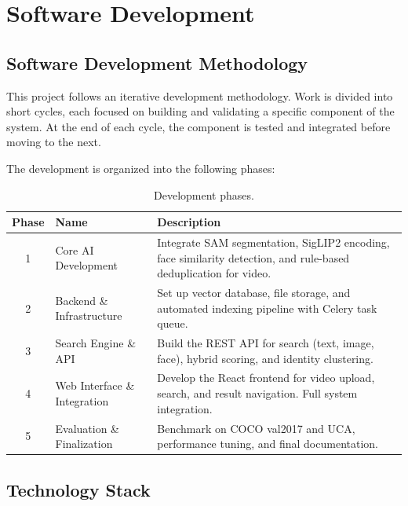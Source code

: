 \chapter{Software Development}
\label{chap:software-development}

\section{Software Development Methodology}
\label{section:software-development-methodology}

This project follows an iterative development methodology. Work is divided into short cycles, each focused on building and validating a specific component of the system. At the end of each cycle, the component is tested and integrated before moving to the next.

The development is organized into the following phases:

\begin{table}[H]
    \centering
    \begin{tabularx}{\textwidth}{c l X}
        \toprule
        \textbf{Phase} & \textbf{Name} & \textbf{Description} \\
        \midrule
        1 & Core AI Development & Integrate SAM segmentation, SigLIP2 encoding, face similarity detection, and rule-based deduplication for video. \\[6pt]
        2 & Backend \& Infrastructure & Set up vector database, file storage, and automated indexing pipeline with Celery task queue. \\[6pt]
        3 & Search Engine \& API & Build the REST API for search (text, image, face), hybrid scoring, and identity clustering. \\[6pt]
        4 & Web Interface \& Integration & Develop the React frontend for video upload, search, and result navigation. Full system integration. \\[6pt]
        5 & Evaluation \& Finalization & Benchmark on COCO val2017 and UCA, performance tuning, and final documentation. \\
        \bottomrule
    \end{tabularx}
    \caption{Development phases.}
    \label{tab:dev-phases}
\end{table}

\section{Technology Stack}
\label{section:technology-stack}

